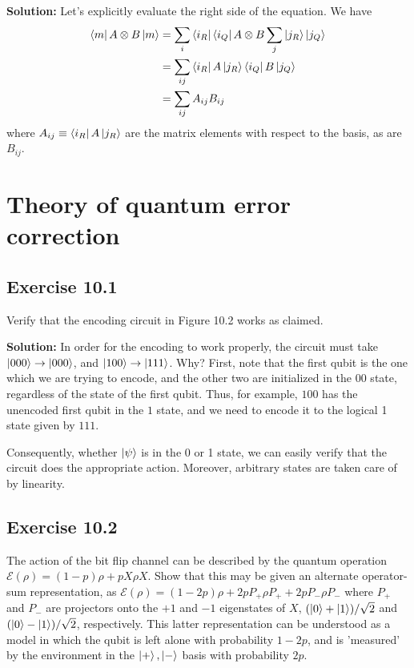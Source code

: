 \documentclass{book}
\newcommand{\mc}[1]{\mathcal{#1}}
\begin{document}
    \textbf{Solution:} Let's explicitly evaluate the right side of the equation. We have
    \begin{align}
    \begin{aligned}
        \bra{m} A \otimes B \ket{m} &= \sum_{i} \bra{i_R}\bra{i_Q} A \otimes B \sum_j \ket{j_R}\ket{j_Q} \\
        &= \sum_{ij} \bra{i_R}A\ket{j_R} \bra{i_Q}B\ket{j_Q} \\
        &= \sum_{ij} A_{ij} B_{ij} 
    \end{aligned}
    \end{align}
    where $A_{ij} \equiv \bra{i_R}A\ket{j_R}$ are the matrix elements with respect to the basis, as are $B_{ij}$. 

\chapter*{Theory of quantum error correction}

\section*{Exercise 10.1}
    Verify that the encoding circuit in Figure 10.2 works as claimed.
    
    \textbf{Solution:} In order for the encoding to work properly, the circuit must take $\ket{000} \rightarrow \ket{000}$, and $\ket{100} \rightarrow \ket{111}$. Why? First, note that the first qubit is the one which we are trying to encode, and the other two are initialized in the $00$ state, regardless of the state of the first qubit. Thus, for example, $100$ has the unencoded first qubit in the $1$ state, and we need to encode it to the logical 1 state given by $111$. 
    
    Consequently, whether $\ket{\psi}$ is in the 0 or 1 state, we can easily verify that the circuit does the appropriate action. Moreover, arbitrary states are taken care of by linearity. 

\section*{Exercise 10.2}
    The action of the bit flip channel can be described by the quantum operation $\mc{E}(\rho) = (1-p)\rho + p X\rho X$. Show that this may be given an alternate operator-sum representation, as $\mc{E}(\rho) = (1-2p)\rho + 2p P_+ \rho P_+ + 2p P_- \rho P_-$ where $P_+$ and $P_-$ are projectors onto the $+1$ and $-1$ eigenstates of $X$, $(\ket{0}+\ket{1})/\sqrt{2}$ and $(\ket{0}-\ket{1})/\sqrt{2}$, respectively. This latter representation can be understood as a model in which the qubit is left alone with probability $1-2p$, and is 'measured' by the environment in the $\ket{+}, \ket{-}$ basis with probability $2p$.
    
\end{document}
